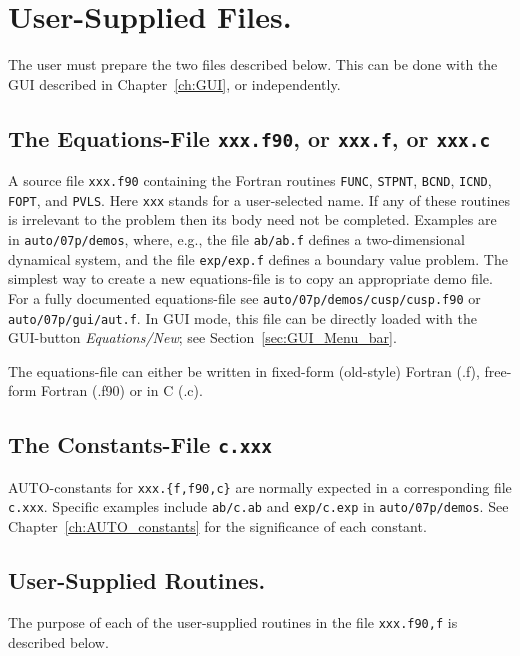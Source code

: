 \documentclass[12pt]{report}
\begin{document}
\chapter{ User-Supplied Files.} \label{ch:User_supplied_files}
The user must prepare the two files described below.
This can be done with the GUI described in Chapter~\ref{ch:GUI}, 
or independently.

\section{ The Equations-File {\tt xxx.f90}, or {\tt xxx.f}, or {\tt xxx.c}} 
A source file {\tt xxx.f90} containing the Fortran routines
{\tt FUNC}, {\tt STPNT}, {\tt BCND}, {\tt ICND}, {\tt FOPT}, and {\tt PVLS}.
Here {\tt xxx} stands for a user-selected name. 
If any of these routines is irrelevant 
to the problem then its body need not be completed.
Examples are in {\tt auto/07p/demos}, where, e.g.,
the file {\tt ab/ab.f} defines a two-dimensional dynamical system,
and the file {\tt exp/exp.f} defines a boundary value problem.
The simplest way to create a new equations-file is to copy 
an appropriate demo file.
For a fully documented equations-file see
{\tt auto/07p/demos/cusp/cusp.f90} or {\tt auto/07p/gui/aut.f}.
In GUI mode, this file can be directly loaded with the GUI-button 
{\it Equations/New}; see Section~\ref{sec:GUI_Menu_bar}.
 
The equations-file can either be written in fixed-form (old-style)
Fortran (.f), free-form Fortran (.f90) or in C (.c).

\section{ The Constants-File {\tt c.xxx}} 
{\cal AUTO}-constants for {\tt xxx.\{f,f90,c\}} are normally expected 
in a corresponding file {\tt c.xxx}.
Specific examples include {\tt ab/c.ab}
and {\tt exp/c.exp} in {\tt auto/07p/demos}.
See Chapter~\ref{ch:AUTO_constants}
for the significance of each constant.

\newpage
\section{ User-Supplied Routines.} \label{sec: User_supplied_routines}
The purpose of each of the user-supplied routines in
the file {\tt xxx.{f90,f}} is described below.
  
\end{document}
